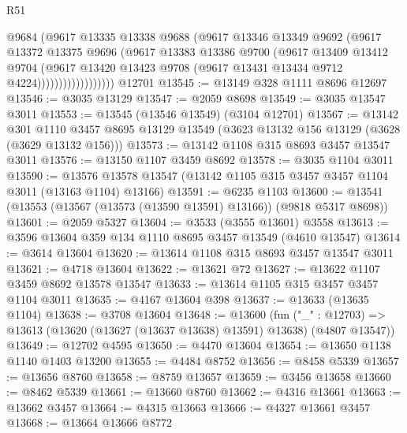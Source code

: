 \begin{lexlean}{R51}
\begin{coremodule}
                          @9684
                          (@9617
                            @13335
                            @13338
                            @9688
                            (@9617
                              @13346
                              @13349
                              @9692
                              (@9617
                                @13372
                                @13375
                                @9696
                                (@9617
                                  @13383
                                  @13386
                                  @9700
                                  (@9617
                                    @13409
                                    @13412
                                    @9704
                                    (@9617
                                      @13420
                                      @13423
                                      @9708
                                      (@9617 @13431 @13434 @9712 @4224))))))))))))))))))
    @12701
@13545 := @13149 @328 @1111 @8696 @12697
@13546 := @3035 @13129
@13547 := @2059 @8698
@13549 := @3035 @13547 @3011
@13553 := @13545 (@13546 @13549) (@3104 @12701)
@13567 := @13142
    @301
    @1110
    @3457
    @8695
    @13129
    @13549
    (@3623 @13132 @156 @13129 (@3628 (@3629 @13132 @156)))
@13573 := @13142 @1108 @315 @8693 @3457 @13547 @3011
@13576 := @13150 @1107 @3459 @8692
@13578 := @3035 @1104 @3011
@13590 := @13576 @13578 @13547 (@13142 @1105 @315 @3457 @3457 @1104 @3011 (@13163 @1104) @13166)
@13591 := @6235 @1103
@13600 := @13541 (@13553 (@13567 (@13573 (@13590 @13591) @13166)) (@9818 @5317 @8698))
@13601 := @2059 @5327
@13604 := @3533 (@3555 @13601) @3558
@13613 := @3596 @13604 @359 @134 @1110 @8695 @3457 @13549 (@4610 @13547)
@13614 := @3614 @13604
@13620 := @13614 @1108 @315 @8693 @3457 @13547 @3011
@13621 := @4718 @13604
@13622 := @13621 @72
@13627 := @13622 @1107 @3459 @8692 @13578 @13547
@13633 := @13614 @1105 @315 @3457 @3457 @1104 @3011
@13635 := @4167 @13604 @398
@13637 := @13633 (@13635 @1104)
@13638 := @3708 @13604
@13648 := @13600
    (fun ("_" : @12703) => @13613 (@13620 (@13627 (@13637 @13638) @13591) @13638) (@4807 @13547))
@13649 := @12702 @4595
@13650 := @4470 @13604
@13654 := @13650 @1138 @1140 @1403 @13200
@13655 := @4484 @8752
@13656 := @8458 @5339
@13657 := @13656 @8760
@13658 := @8759 @13657
@13659 := @3456 @13658
@13660 := @8462 @5339
@13661 := @13660 @8760
@13662 := @4316 @13661
@13663 := @13662 @3457
@13664 := @4315 @13663
@13666 := @4327 @13661 @3457
@13668 := @13664 @13666 @8772

\end{coremodule}
\end{lexlean}
